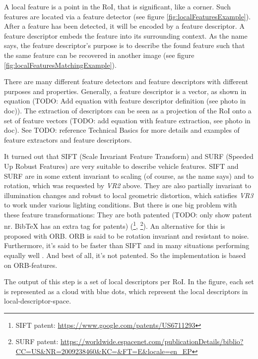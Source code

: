 A local feature is a point in the RoI, that is significant, like a corner. Such features are located via a feature detector (see figure \ref{fig:localFeaturesExample}). After a feature has been detected, it will be encoded by a feature descriptor. A feature descriptor embeds the feature into its surrounding context. As the name says, the feature descriptor's purpose is to describe the found feature such that the same feature can be recovered in another image (see figure \ref{fig:localFeaturesMatchingExample}).

There are many different feature detectors and feature descriptors with different purposes and properties. Generally, a feature descriptor is a vector, as shown in equation (TODO: Add equation with feature descriptor definition (see photo in doc)). The extraction of descriptors can be seen as a projection of the RoI onto a set of feature vectors (TODO: add equation with feature extraction, see photo in doc). See TODO: reference Technical Basics for more details and examples of feature extractors and feature descriptors.

It turned out that SIFT (Scale Invariant Feature Transform) \citep{lowe1999object} and SURF (Speeded Up Robust Features) \citep{bay2008speeded} are very suitable to describe vehicle features. SIFT and SURF are in some extent invariant to scaling (of course, as the name says) and to rotation, which was requested by \emph{VR2} above. They are also partially invariant to illumination changes and robust to local geometric distortion, which satisfies \emph{VR3} to work under various lighting conditions. But there is one big problem with these feature transformations: They are both patented (TODO: only show patent nr. BibTeX has an extra tag for patents) (\footnote{SIFT patent: \url{https://www.google.com/patents/US6711293}}, \footnote{SURF patent: \url{https://worldwide.espacenet.com/publicationDetails/biblio?CC=US&NR=2009238460&KC=&FT=E&locale=en_EP}}). An alternative for this is proposed with ORB. ORB is said to be rotation invariant and resistant to noise. Furthermore, it's said to be faster than SIFT and in many situations performing equally well \citep{rublee2011orb}. And best of all, it's not patented. So the implementation is based on ORB-features.

The output of this step is a set of local descriptors per RoI. In the figure, each set is represented as a cloud with blue dots, which represent the local descriptors in local-descriptor-space.

